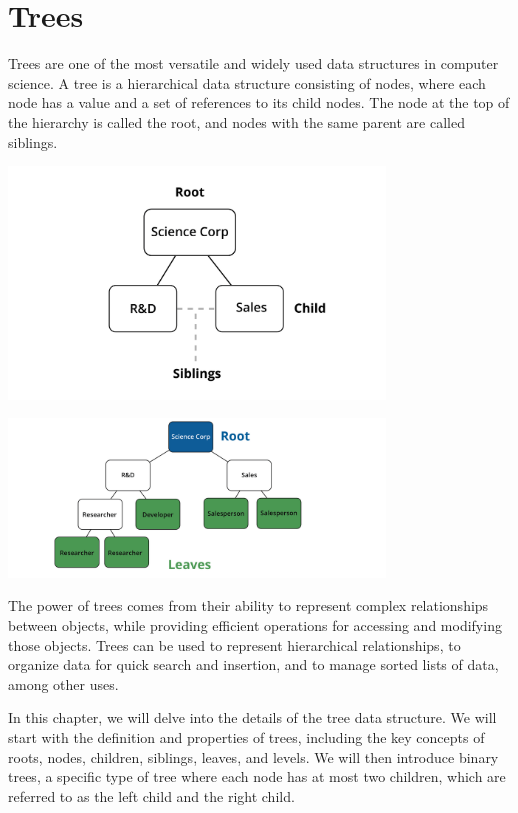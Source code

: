 \chapter{Trees}

Trees are one of the most versatile and widely used data structures in computer science. A tree is a hierarchical data structure consisting of nodes, where each node has a value and a set of references to its child nodes. The node at the top of the hierarchy is called the root, and nodes with the same parent are called siblings.

\includegraphics[width=0.75\textwidth]{parentChild.png}

\includegraphics[width=0.75\textwidth]{rootLeaves.png}


The power of trees comes from their ability to represent complex relationships between objects, while providing efficient operations for accessing and modifying those objects. Trees can be used to represent hierarchical relationships, to organize data for quick search and insertion, and to manage sorted lists of data, among other uses.

In this chapter, we will delve into the details of the tree data structure. We will start with the definition and properties of trees, including the key concepts of roots, nodes, children, siblings, leaves, and levels. We will then introduce binary trees, a specific type of tree where each node has at most two children, which are referred to as the left child and the right child.

